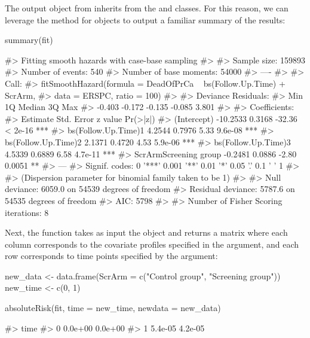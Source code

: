 The output object from  inherits from the
 and  classes. For this reason, we can
leverage the  method for  objects to output a
familiar summary of the results:

\begin{Schunk}
\begin{Sinput}
summary(fit) 
\end{Sinput}
\begin{Soutput}
#> Fitting smooth hazards with case-base sampling
#> 
#> Sample size: 159893 
#> Number of events: 540 
#> Number of base moments: 54000 
#> ----
#> 
#> Call:
#> fitSmoothHazard(formula = DeadOfPrCa ~ bs(Follow.Up.Time) + ScrArm, 
#>     data = ERSPC, ratio = 100)
#> 
#> Deviance Residuals: 
#>    Min      1Q  Median      3Q     Max  
#> -0.403  -0.172  -0.135  -0.085   3.801  
#> 
#> Coefficients:
#>                       Estimate Std. Error z value Pr(>|z|)    
#> (Intercept)           -10.2533     0.3168  -32.36  < 2e-16 ***
#> bs(Follow.Up.Time)1     4.2544     0.7976    5.33  9.6e-08 ***
#> bs(Follow.Up.Time)2     2.1371     0.4720    4.53  5.9e-06 ***
#> bs(Follow.Up.Time)3     4.5339     0.6889    6.58  4.7e-11 ***
#> ScrArmScreening group  -0.2481     0.0886   -2.80   0.0051 ** 
#> ---
#> Signif. codes:  0 '***' 0.001 '**' 0.01 '*' 0.05 '.' 0.1 ' ' 1
#> 
#> (Dispersion parameter for binomial family taken to be 1)
#> 
#>     Null deviance: 6059.0  on 54539  degrees of freedom
#> Residual deviance: 5787.6  on 54535  degrees of freedom
#> AIC: 5798
#> 
#> Number of Fisher Scoring iterations: 8
\end{Soutput}
\end{Schunk}

Next, the  function takes as input the
 object and returns a matrix where each column
corresponds to the covariate profiles specified in the 
argument, and each row corresponds to time points specified by the
 argument:

\begin{Schunk}
\begin{Sinput}
new_data <- data.frame(ScrArm = c("Control group", "Screening group"))
new_time <- c(0, 1)

absoluteRisk(fit, time = new_time, newdata = new_data)
\end{Sinput}
\begin{Soutput}
#>  time                
#>     0 0.0e+00 0.0e+00
#>     1 5.4e-05 4.2e-05
\end{Soutput}
\end{Schunk}

